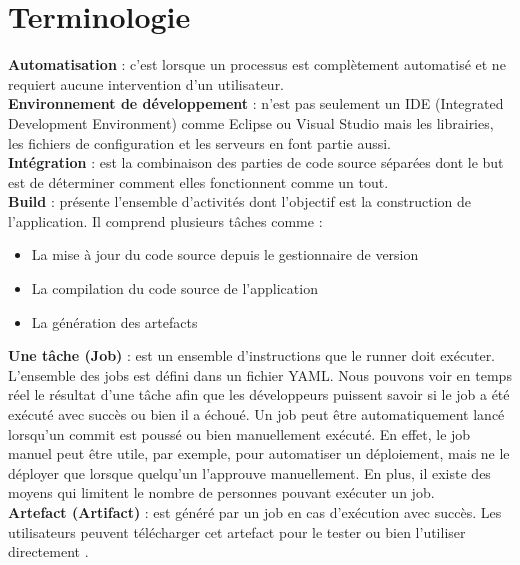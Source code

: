 \chapter*{Terminologie}


\textbf{Automatisation} : c’est lorsque un processus est complètement automatisé et ne requiert aucune intervention d’un utilisateur.
\\

\textbf{Environnement de développement}
: n’est pas seulement un IDE (Integrated
Development Environment) comme Eclipse ou Visual Studio mais les librairies,
les fichiers de configuration et les serveurs en font partie aussi.\\

\textbf{Intégration}
: est la combinaison des parties de code source séparées dont le but
est de déterminer comment elles fonctionnent comme un tout.\\

\textbf{Build}
: présente l’ensemble d’activités dont l’objectif est la construction de l’application. Il comprend plusieurs tâches comme :
\begin{itemize}
    \item La mise à jour du code source depuis le gestionnaire de version
    \item La compilation du code source de l’application
    \item La génération des artefacts\\
\end{itemize}

\textbf{Une tâche (Job)}
: est un ensemble d’instructions que le runner doit exécuter. \cite{ref3}
L’ensemble des jobs est défini dans un fichier YAML. Nous pouvons voir en temps réel le résultat d’une tâche afin que les développeurs puissent savoir si le job a été exécuté avec succès ou bien il a échoué.
Un job peut être automatiquement lancé lorsqu’un commit est poussé ou bien manuellement exécuté. En effet, le job manuel peut être utile, par exemple, pour
automatiser un déploiement, mais ne le déployer que lorsque quelqu’un l’approuve manuellement. En plus, il existe des moyens qui limitent le nombre de personnes
pouvant exécuter un job.\\

\textbf{Artefact (Artifact)}
: est généré par un job en cas d’exécution avec succès. Les
utilisateurs peuvent télécharger cet artefact pour le tester ou bien l’utiliser
directement \cite{ref3}.\\

